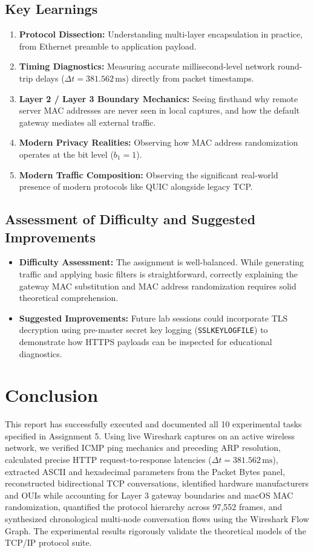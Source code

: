 \documentclass[11pt,a4paper]{article}
\begin{document}
\subsection{Key Learnings}
\begin{enumerate}[leftmargin=*]
    \item \textbf{Protocol Dissection:} Understanding multi-layer encapsulation in practice, from Ethernet preamble to application payload.
    \item \textbf{Timing Diagnostics:} Measuring accurate millisecond-level network round-trip delays ($\Delta t = 381.562\,\text{ms}$) directly from packet timestamps.
    \item \textbf{Layer 2 / Layer 3 Boundary Mechanics:} Seeing firsthand why remote server MAC addresses are never seen in local captures, and how the default gateway mediates all external traffic.
    \item \textbf{Modern Privacy Realities:} Observing how MAC address randomization operates at the bit level ($b_1 = 1$).
    \item \textbf{Modern Traffic Composition:} Observing the significant real-world presence of modern protocols like QUIC alongside legacy TCP.
\end{enumerate}

\subsection{Assessment of Difficulty and Suggested Improvements}
\begin{itemize}[leftmargin=*]
    \item \textbf{Difficulty Assessment:} The assignment is well-balanced. While generating traffic and applying basic filters is straightforward, correctly explaining the gateway MAC substitution and MAC address randomization requires solid theoretical comprehension.
    \item \textbf{Suggested Improvements:} Future lab sessions could incorporate TLS decryption using pre-master secret key logging (\texttt{SSLKEYLOGFILE}) to demonstrate how HTTPS payloads can be inspected for educational diagnostics.
\end{itemize}

\section{Conclusion}
This report has successfully executed and documented all 10 experimental tasks specified in Assignment 5. Using live Wireshark captures on an active wireless network, we verified ICMP ping mechanics and preceding ARP resolution, calculated precise HTTP request-to-response latencies ($\Delta t = 381.562\,\text{ms}$), extracted ASCII and hexadecimal parameters from the Packet Bytes panel, reconstructed bidirectional TCP conversations, identified hardware manufacturers and OUIs while accounting for Layer 3 gateway boundaries and macOS MAC randomization, quantified the protocol hierarchy across 97,552 frames, and synthesized chronological multi-node conversation flows using the Wireshark Flow Graph. The experimental results rigorously validate the theoretical models of the TCP/IP protocol suite.
\end{document}
